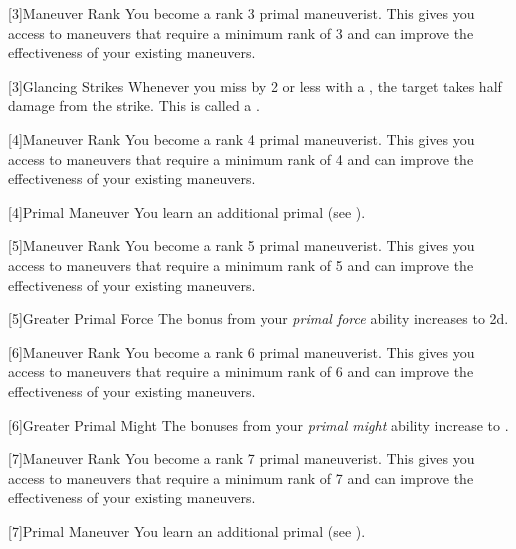         {
            [3]{Maneuver Rank} You become a rank 3 primal maneuverist.
            This gives you access to maneuvers that require a minimum rank of 3 and can improve the effectiveness of your existing maneuvers.

            [3]{Glancing Strikes} Whenever you miss by 2 or less with a , the target takes half damage from the strike.
            This is called a .
        }

        {
            [4]{Maneuver Rank} You become a rank 4 primal maneuverist.
            This gives you access to maneuvers that require a minimum rank of 4 and can improve the effectiveness of your existing maneuvers.

            [4]{Primal Maneuver}
            You learn an additional primal  (see ).
        }

        {
            [5]{Maneuver Rank} You become a rank 5 primal maneuverist.
            This gives you access to maneuvers that require a minimum rank of 5 and can improve the effectiveness of your existing maneuvers.

            [5]{Greater Primal Force} The bonus from your \textit{primal force} ability increases to \plus2d.
        }

        {
            [6]{Maneuver Rank} You become a rank 6 primal maneuverist.
            This gives you access to maneuvers that require a minimum rank of 6 and can improve the effectiveness of your existing maneuvers.

            [6]{Greater Primal Might} The bonuses from your \textit{primal might} ability increase to .
        }

        {
            [7]{Maneuver Rank} You become a rank 7 primal maneuverist.
            This gives you access to maneuvers that require a minimum rank of 7 and can improve the effectiveness of your existing maneuvers.

            [7]{Primal Maneuver}
            You learn an additional primal  (see ).

        }


\newpage
